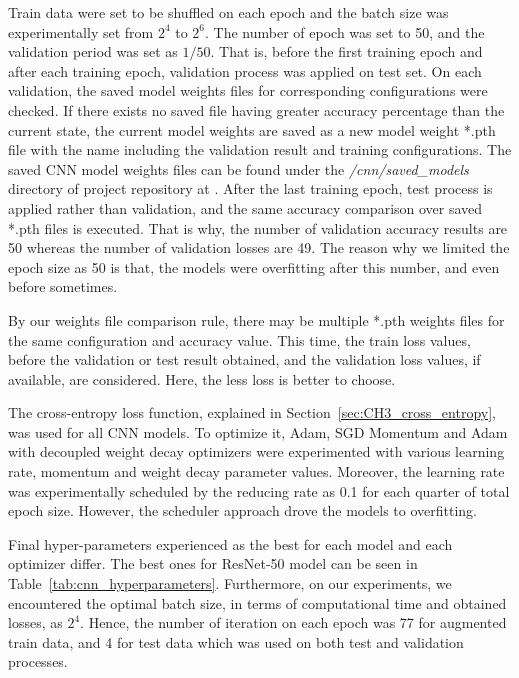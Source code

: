 Train data were set to be shuffled on each epoch and the batch size was experimentally set from $2^4$ to $2^6$. The number of epoch was set to 50, and the validation period was set as $1/50$. That is, before the first training epoch and after each training epoch, validation process was applied on test set. On each validation, the saved model weights files for corresponding configurations were checked. If there exists no saved file having greater accuracy percentage than the current state, the current model weights are saved as a new model weight *.pth file with the name including the validation result and training configurations. The saved CNN model weights files can be found under the \textit{/cnn/saved\_models} directory of project repository at . After the last training epoch, test process is applied rather than validation, and the same accuracy comparison over saved *.pth files is executed. That is why, the number of validation accuracy results are 50 whereas the number of validation losses are 49. The reason why we limited the epoch size as 50 is that, the models were overfitting after this number, and even before sometimes.

By our weights file comparison rule, there may be multiple *.pth weights files for the same configuration and accuracy value. This time, the train loss values, before the validation or test result obtained, and the validation loss values, if available, are considered. Here, the less loss is better to choose.

The cross-entropy loss function, explained in Section~\ref{sec:CH3_cross_entropy}, was used for all CNN models. To optimize it, Adam, SGD Momentum and Adam with decoupled weight decay optimizers were experimented with various learning rate, momentum and weight decay parameter values. Moreover, the learning rate was experimentally scheduled by the reducing rate as 0.1 for each quarter of total epoch size. However, the scheduler approach drove the models to overfitting. 

Final hyper-parameters experienced as the best for each model and each optimizer differ. The best ones for ResNet-50 model can be seen in Table~\ref{tab:cnn_hyperparameters}. Furthermore, on our experiments, we encountered the optimal batch size, in terms of computational time and obtained losses, as $2^4$. Hence, the number of iteration on each epoch was 77 for augmented train data, and 4 for test data which was used on both test and validation processes.

